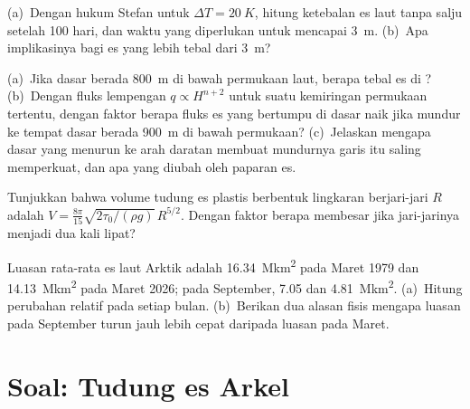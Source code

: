 \begin{exercise}[$\star\star$]\label{exo:b3:glaciology:9}
(a)~Dengan hukum Stefan untuk $\Delta T = \qty{20}{K}$, hitung ketebalan
es laut tanpa salju setelah 100 hari, dan waktu yang diperlukan untuk mencapai \qty{3}{m}.
(b)~Apa implikasinya bagi es yang lebih tebal dari \qty{3}{m}?
\end{exercise}

\begin{exercise}[$\star\star\star$]\label{exo:b3:glaciology:10}
(a)~Jika dasar berada \qty{800}{m} di bawah permukaan laut, berapa tebal es di
? (b)~Dengan fluks lempengan $q \propto H^{n+2}$ untuk suatu
kemiringan permukaan tertentu, dengan faktor berapa fluks es yang bertumpu di dasar naik jika
 mundur ke tempat dasar berada \qty{900}{m} di bawah permukaan? (c)~Jelaskan
mengapa dasar yang menurun ke arah daratan membuat mundurnya garis itu saling memperkuat, dan
apa yang diubah oleh paparan es.
\end{exercise}

\begin{exercise}[$\star\star\star$]\label{exo:b3:glaciology:11}
Tunjukkan bahwa volume tudung es plastis berbentuk lingkaran berjari-jari $R$ adalah $V =
\frac{8\pi}{15}\sqrt{2\tau_0/(\rho g)}\,R^{5/2}$. Dengan faktor berapa
 membesar jika jari-jarinya menjadi dua kali lipat?
\end{exercise}

\begin{exercise}[$\star\star\star$]\label{exo:b3:glaciology:12}
Luasan rata-rata es laut Arktik adalah \qty{16.34}{\mega km^2} pada Maret 1979 dan
\qty{14.13}{\mega km^2} pada Maret 2026; pada September, \num{7.05} dan
\qty{4.81}{\mega km^2}. (a)~Hitung perubahan relatif pada setiap bulan.
(b)~Berikan dua alasan fisis mengapa luasan pada September turun
jauh lebih cepat daripada luasan pada Maret.
\end{exercise}

\section{Soal: Tudung es Arkel}


